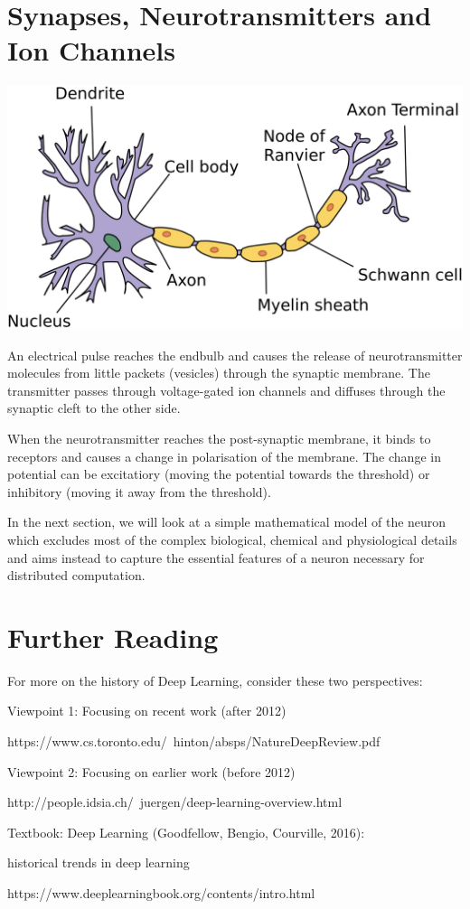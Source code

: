 \documentclass[11pt]{article}
\begin{document}
\section{Synapses, Neurotransmitters and Ion Channels}\label{sec:synapses-neurotransmitters-and-ion-channels}
\includegraphics{img_8}

An electrical pulse reaches the endbulb and causes the release of neurotransmitter molecules from little packets (vesicles) through the synaptic membrane.
The transmitter passes through voltage-gated ion channels and diffuses through the synaptic cleft to the other side.

When the neurotransmitter reaches the post-synaptic membrane, it binds to receptors and causes a change in polarisation of the membrane.
The change in potential can be excitatiory (moving the potential towards the threshold) or inhibitory (moving it away from the threshold).

In the next section, we will look at a simple mathematical model of the neuron which excludes most of the complex biological, chemical and physiological details and aims instead to capture the essential features of a neuron necessary for distributed computation.

\section{Further Reading}\label{sec:further-reading}
For more on the history of Deep Learning, consider these two perspectives:

Viewpoint 1: Focusing on recent work (after 2012)

https://www.cs.toronto.edu/~hinton/absps/NatureDeepReview.pdf

Viewpoint 2: Focusing on earlier work (before 2012)

http://people.idsia.ch/~juergen/deep-learning-overview.html

Textbook: Deep Learning (Goodfellow, Bengio, Courville, 2016):

historical trends in deep learning

https://www.deeplearningbook.org/contents/intro.html
\end{document}
